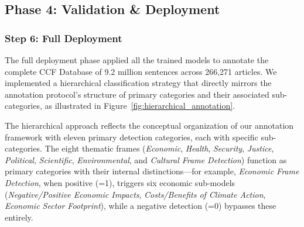 \subsection{Phase 4: Validation \& Deployment}

\subsubsection{Step 6: Full Deployment}

The full deployment phase applied all the trained models to annotate the complete CCF Database of 9.2 million sentences across 266,271 articles. We implemented a hierarchical classification strategy that directly mirrors the annotation protocol's structure of primary categories and their associated sub-categories, as illustrated in Figure~\ref{fig:hierarchical_annotation}. 

The hierarchical approach reflects the conceptual organization of our annotation framework with eleven primary detection categories, each with specific sub-categories. The eight thematic frames (\emph{Economic}, \emph{Health}, \emph{Security}, \emph{Justice}, \emph{Political}, \emph{Scientific}, \emph{Environmental}, and \emph{Cultural Frame Detection}) function as primary categories with their internal distinctions—for example, \emph{Economic Frame Detection}, when positive (=1), triggers six economic sub-models (\emph{Negative/Positive Economic Impacts}, \emph{Costs/Benefits of Climate Action}, \emph{Economic Sector Footprint}), while a negative detection (=0) bypasses these entirely. 

